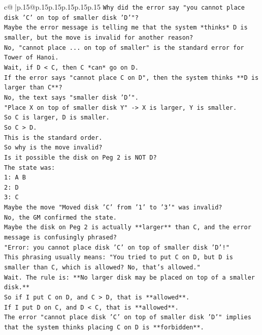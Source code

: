 \documentclass{article}
\begin{document}
{\begin{supertabular}{c@{$\;$}|p{.15\linewidth}@{}p{.15\linewidth}p{.15\linewidth}p{.15\linewidth}p{.15\linewidth}p{.15\linewidth}}
{{{\texttt{Why did the error say "you cannot place disk 'C' on top of smaller disk 'D'"?} \\
\texttt{Maybe the error message is telling me that the system *thinks* D is smaller, but the move is invalid for another reason?} \\
\texttt{No, "cannot place ... on top of smaller" is the standard error for Tower of Hanoi.} \\
\texttt{Wait, if D < C, then C *can* go on D.} \\
\texttt{If the error says "cannot place C on D", then the system thinks **D is larger than C**?} \\
\texttt{No, the text says "smaller disk 'D'".} \\
\texttt{"Place X on top of smaller disk Y" {-}> X is larger, Y is smaller.} \\
\texttt{So C is larger, D is smaller.} \\
\texttt{So C > D.} \\
\texttt{This is the standard order.} \\
\texttt{So why is the move invalid?} \\
\texttt{Is it possible the disk on Peg 2 is NOT D?} \\
\texttt{The state was:} \\
\texttt{1: A B} \\
\texttt{2: D} \\
\texttt{3: C} \\
\texttt{Maybe the move "Moved disk 'C' from '1' to '3'" was invalid?} \\
\texttt{No, the GM confirmed the state.} \\
\texttt{Maybe the disk on Peg 2 is actually **larger** than C, and the error message is confusingly phrased?} \\
\texttt{"Error: you cannot place disk 'C' on top of smaller disk 'D'!"} \\
\texttt{This phrasing usually means: "You tried to put C on D, but D is smaller than C, which is allowed? No, that's allowed."} \\
\texttt{Wait. The rule is: **No larger disk may be placed on top of a smaller disk.**} \\
\texttt{So if I put C on D, and C > D, that is **allowed**.} \\
\texttt{If I put D on C, and D < C, that is **allowed**.} \\
\texttt{The error "cannot place disk 'C' on top of smaller disk 'D'" implies that the system thinks placing C on D is **forbidden**.} \\
}}}
\end{supertabular}}
\end{document}
